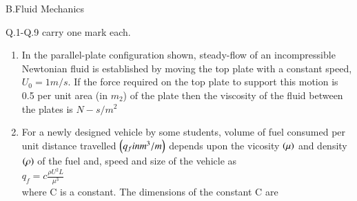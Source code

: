 \documentclass[journal]{IEEEtran}
\begin{document}
\begin{center}
   B.Fluid Mechanics
\end{center}
Q.1-Q.9 carry one mark each.
\begin{enumerate}[start=1]
\item %
In the parallel-plate configuration shown, steady-flow of an incompressible Newtonian fluid is established by moving the top plate with a constant speed, $U_0=1m/s$. If the force required on the top plate to support this motion is 0.5 per unit area (in $m_2$) of the plate then the viscosity of the fluid between the plates is \underline{\hspace{2cm}} $N-s/m^2$ 
\begin{figure}[!ht]
\centering
{}%
\label{fig:my_label}
\end{figure}
\item %
For a newly designed vehicle by some students, volume of fuel consumed per unit distance travelled $\left(q_f in m^3/m\right)$ depends upon the vicosity $\left(\mu\right)$ and density $\left(\rho\right)$ of the fuel and, speed  and size  of the vehicle as \\
$q_f = c\frac{\rho U^2 L}{\mu ^3}$ \\
where C is a constant. The dimensions of the constant C are
\begin{enumerate}

\end{enumerate}
\end{enumerate}
\end{document}
